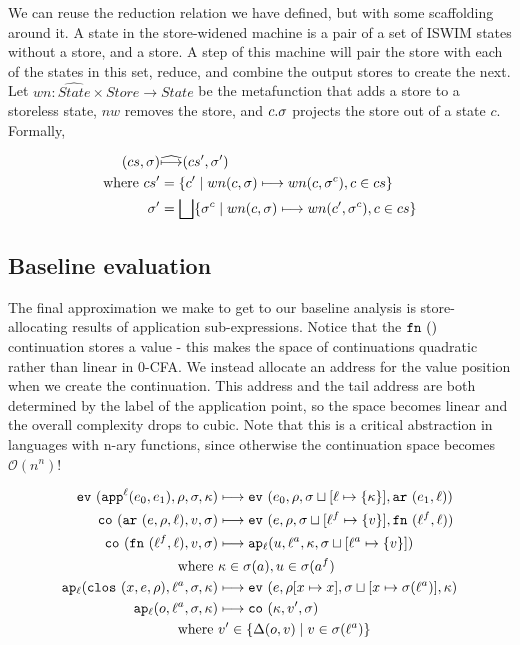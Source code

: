 \documentclass[preprint,onecolumn,9pt]{sigplanconf} %
\begin{document}
We can reuse the reduction relation we have defined, but with some
scaffolding around it. A state in the store-widened machine is a pair
of a set of ISWIM states without a store, and a store. A step of this
machine will pair the store with each of the states in this set,
reduce, and combine the output stores to create the next. Let $wn :
\widehat{State} \times Store \to State$ be the metafunction that adds
a store to a storeless state, $nw$ removes the store, and $c.\msto$
projects the store out of a state $c$. Formally,

\begin{align*}
(cs, \msto) &\widehat{\machstep} (cs', \msto') \\
\mbox{where } cs' &= \{c' \mid wn(c, \msto) \machstep wn(c, \msto^c), c \in cs\} \\
              \msto' &= \bigsqcup\{\msto^c \mid wn(c,\msto)\machstep wn(c', \msto^c), c \in cs\}
\end{align*}

\subsection{Baseline evaluation}
\label{sec:baselineeval}

The final approximation we make to get to our baseline analysis is
store-allocating results of application sub-expressions. Notice that
the $\kfn{}$ continuation stores a value - this makes the space of
continuations quadratic rather than linear in 0-CFA. We instead
allocate an address for the value position when we create the
continuation. This address and the tail address are both determined by
the label of the application point, so the space becomes linear and
the overall complexity drops to cubic. Note that this is a critical
abstraction in languages with n-ary functions, since otherwise the
continuation space becomes ${\mathcal O}(n^n)$!

\begin{align*}
\ev{\sapp[^\mlab]{\mexpi0}{\mexpi1},\menv,\msto,\mkont} &\machstep
\ev{\mexpi{0},\menv,\msto\sqcup[\mlab \mapsto \{\mkont\}],\kar{\mexpi{1},\mlab}}
\\
\co{\kar{\mexp,\menv,\mlab},\mval,\msto} & \machstep
\ev{\mexp,\menv,\msto\sqcup[\mlab^f \mapsto \{\mval\}],\kfn{\mlab^f,\mlab}}
\\
\co{\kfn{\mlab^f,\mlab},\mval,\msto} & \machstep
\ap[_\mlab]{\mvalx{u},\mlab^a,\mkont,\msto\sqcup[\mlab^a \mapsto \{\mval\}]}
\\
\text{ where } &\mkont \in \msto(\maddr), \mvalx{u} \in \msto(\maddr^f)
\\
\ap[_\mlab]{\clos{\mvar,\mexp,\menv},\mlab^a, \msto,\mkont} & \machstep
\ev{\mexp,\menv[\mvar\mapsto\mvar],\msto\sqcup[\mvar \mapsto \msto(\mlab^a)],\mkont}
\\
\ap[_\mlab]{\mop,\mlab^a,\msto,\mkont} & \machstep
\co{\mkont,\mval',\msto}
\\
\text{ where }& \mval'\in \{\interpdelta(\mop,\mval) \mid \mval \in \msto(\mlab^a)\}
\end{align*}
\end{document}
